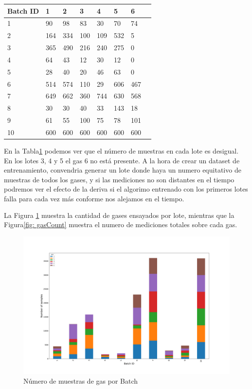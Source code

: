 \begin{table}
    \centering
    \begin{tabular}{|l|l|l|l|l|l|l|l|}
    \hline
        Batch ID & 1 & 2 & 3 & 4 & 5 & 6 \\ \hline
        1 & 90   & 98  & 83  & 30  & 70  & 74   \\ \hline
        2 & 164  & 334 & 100 & 109 & 532 & 5    \\ \hline
        3 & 365  & 490 & 216 & 240 & 275 & 0    \\ \hline
        4 & 64   & 43  & 12  & 30  & 12  & 0    \\ \hline
        5 & 28   & 40  & 20  & 46  & 63  & 0    \\ \hline
        6 & 514  & 574 & 110 & 29  & 606 & 467  \\ \hline
        7 & 649  & 662 & 360 & 744 & 630 & 568  \\ \hline
        8 & 30   & 30  & 40  & 33  & 143 & 18   \\ \hline
        9 & 61   & 55  & 100 & 75  & 78  & 101  \\ \hline
        10 & 600 & 600 & 600 & 600 & 600 & 600  \\ \hline
    \end{tabular}
    \label{Tab: Numero de Gases por cada Batch}
\end{table}

En la Tabla\ref{Tab: Numero de Gases por cada Batch} podemos ver que el número de muestras en cada lote
es desigual. En los lotes 3, 4 y 5 el gas 6 no está presente. A la hora de crear un dataset de entrenamiento,
convendria generar un lote donde haya un numero equitativo de muestras de todos los gases,
y si las mediciones no son distantes en el tiempo podremos ver el efecto de la deriva si el algorimo entrenado con
los primeros lotes falla para cada vez más conforme nos alejamos en el tiempo.

La Figura \ref{fig: gasBatchCount} muestra la cantidad de gases ensayados por lote, mientras que
la Figura\ref{fig: gasCount} muestra el numero de mediciones totales sobre cada gas.

\begin{figure}[ht!]
	\centering
	\includegraphics[width=\columnwidth]{../py_imgs/Step0_Count_Batch_Gas.png}
	\caption{Número de muestras de gas por Batch}
	\label{fig: gasBatchCount}
\end{figure}

